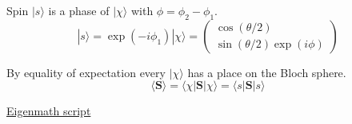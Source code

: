 Spin $|s\rangle$ is a phase of $|\chi\rangle$ with $\phi=\phi_2-\phi_1$.
\begin{equation*}
|s\rangle=\exp(-i\phi_1)|\chi\rangle
=\begin{pmatrix}
\cos(\theta/2)
\\
\sin(\theta/2)\exp(i\phi)
\end{pmatrix}
\end{equation*}

By equality of expectation every $|\chi\rangle$ has a place on the Bloch sphere.
\begin{equation*}
\langle\mathbf S\rangle=\langle\chi|\mathbf S|\chi\rangle=\langle s|\mathbf S|s\rangle
\end{equation*}

\href{https://georgeweigt.github.io/examples/bloch-sphere-demo.html}{Eigenmath script}


